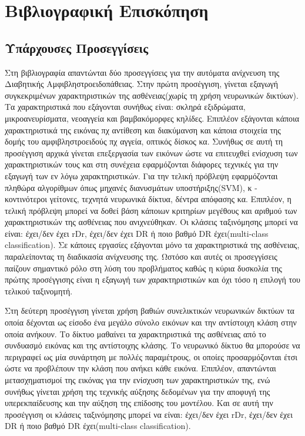 \chapter{Βιβλιογραφική Επισκόπηση }
\label{chap:2}
\thispagestyle{plain}


\section{Υπάρχουσες Προσεγγίσεις}
\label{sec:2.1}
Στη βιβλιογραφία απαντώνται δύο προσεγγίσεις για την αυτόματα ανίχνευση της Διαβητικής Αμφιβληστροειδοπάθειας. Στην πρώτη προσέγγιση, γίνεται εξαγωγή συγκεκριμένων χαρακτηριστικών της ασθένειας(χωρίς τη χρήση νευρωνικών δικτύων). Τα χαρακτηριστικά που εξάγονται συνήθως είναι: σκληρά εξιδρώματα, μικροανευρίσματα, νεοαγγεία και βαμβακόμορφες κηλίδες. Επιπλέον εξάγονται κάποια χαρακτηριστικά της εικόνας πχ αντίθεση και διακύμανση και κάποια στοιχεία της δομής του αμφιβληστροειδούς πχ αγγεία, οπτικός δίσκος κα. Συνήθως σε αυτή τη προσέγγιση αρχικά γίνεται επεξεργασία των εικόνων ώστε να επιτευχθεί ενίσχυση των χαρακτηριστικών τους και στη συνέχεια εφαρμόζονται διάφορες τεχνικές για την εξαγωγή των εν λόγω χαρακτηριστικών\cite{Nayak}. Για την τελική πρόβλεψη εφαρμόζονται πληθώρα αλγορίθμων όπως μηχανές διανυσμάτων υποστήριξης(SVM), κ - κοντινότεροι γείτονες, τεχνητά νευρωνικά δίκτυα, δέντρα απόφασης κα. Επιπλέον, η τελική πρόβλεψη μπορεί να δοθεί βάση κάποιων κριτηρίων μεγέθους και αριθμού των χαρακτηριστικών της ασθένειας που ανιχνεύθηκαν. Οι κλάσεις ταξινόμησης μπορεί να είναι: έχει/δεν έχει rDr, έχει/δεν έχει DR ή ποιο βαθμό DR έχει(multi-class classification). Σε κάποιες εργασίες εξάγονται μόνο τα χαρακτηριστικά της ασθένειας, παραλείποντας τη διαδικασία ανίχνευσης της. Ωστόσο και αυτές οι προσεγγίσεις παίζουν σημαντικό ρόλο στη λύση του προβλήματος καθώς η κύρια δυσκολία της πρώτης προσέγγισης είναι η εξαγωγή των χαρακτηριστικών και όχι τόσο η επιλογή του τελικού ταξινομητή.

 
 Στη δεύτερη προσέγγιση γίνεται χρήση βαθιών συνελικτικών νευρωνικών δικτύων τα οποία δέχονται ως είσοδο ένα μεγάλο σύνολο εικόνων και την αντίστοιχη κλάση στην οποία ανήκουν. Το δίκτυο μαθαίνει τα χαρακτηριστικά της ασθένειας από το συνδυασμό εικόνας και της αντίστοιχης κλάσης. Το νευρωνικό δίκτυο θα μπορούσε να περιγραφεί ως μία συνάρτηση με πολλές παραμέτρους, οι οποίες προσαρμόζονται έτσι ώστε να προβλέπουν την κλάση που ανήκει κάθε εικόνα.  Επιπλέον, απαντώνται μετασχηματισμοί της εικόνας για την ενίσχυση των χαρακτηριστικών της, ενώ συνήθως γίνεται χρήση της τεχνικής αύξησης δεδομένων για την αποφυγή της υπερεκπαίδευσης και την αύξηση της επίδοσης του μοντέλου. Και σε αυτή την προσέγγιση οι κλάσεις ταξινόμησης μπορεί να είναι: έχει/δεν έχει rDr, έχει/δεν έχει DR ή ποιο βαθμό DR έχει(multi-class classification).

